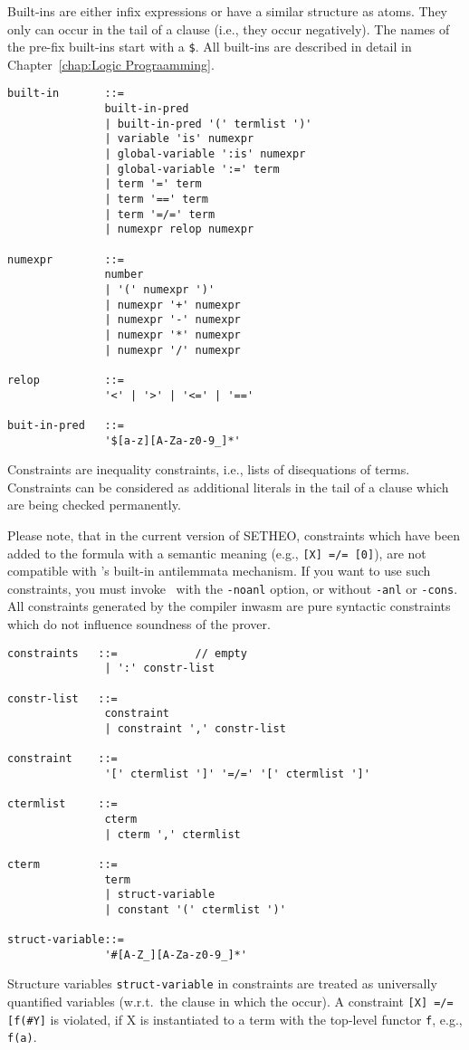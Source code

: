 Built-ins are either infix expressions or have a similar
structure as atoms. They only can occur in the tail of
a clause (i.e., they occur negatively).
The names of the pre-fix built-ins
start with a {\tt \$}. All built-ins are described
in detail in Chapter~\ref{chap:Logic Prograamming}.

\begin{verbatim}
built-in       ::=
               built-in-pred
               | built-in-pred '(' termlist ')'
               | variable 'is' numexpr
               | global-variable ':is' numexpr
               | global-variable ':=' term
               | term '=' term
               | term '==' term
               | term '=/=' term
               | numexpr relop numexpr

numexpr        ::=
               number
               | '(' numexpr ')'
               | numexpr '+' numexpr
               | numexpr '-' numexpr
               | numexpr '*' numexpr
               | numexpr '/' numexpr

relop          ::=
               '<' | '>' | '<=' | '=='

buit-in-pred   ::=
               '$[a-z][A-Za-z0-9_]*'
\end{verbatim}

Constraints are inequality constraints, i.e., lists of
disequations of terms.
Constraints can be considered as additional literals in the tail
of a clause which are being checked permanently.

Please note, that in the current version of SETHEO, constraints
which have been added to the formula with a semantic meaning
(e.g., {\tt [X] =/= [0]}), are not compatible with \SAM's built-in
antilemmata mechanism. 
If you want to use such constraints, you must
invoke \SAM\ with the {\tt -noanl} option, 
or without {\tt -anl} or {\tt -cons}.
All constraints generated by the compiler inwasm are pure syntactic
constraints which do not influence soundness of the prover.


\begin{verbatim}
constraints   ::=            // empty
               | ':' constr-list

constr-list   ::=
               constraint
               | constraint ',' constr-list

constraint    ::=
               '[' ctermlist ']' '=/=' '[' ctermlist ']'

ctermlist     ::=
               cterm
               | cterm ',' ctermlist

cterm         ::=
               term
               | struct-variable
               | constant '(' ctermlist ')'

struct-variable::=
               '#[A-Z_][A-Za-z0-9_]*'
\end{verbatim}

Structure variables {\tt struct-variable} in constraints
are treated as universally quantified variables (w.r.t.\ the clause
in which the occur). A constraint {\tt [X] =/= [f(\#Y]} is
violated, if X is instantiated to a term with the top-level
functor {\tt f}, e.g., {\tt f(a)}.
